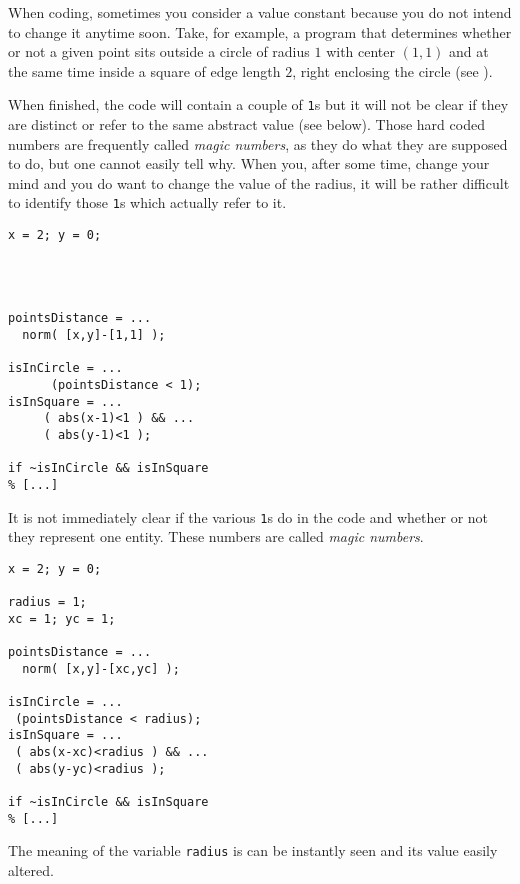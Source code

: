 When coding, sometimes you consider a value constant because you do not intend
to change it anytime soon. Take, for example, a program that determines
whether or not a given point sits outside a circle of radius $1$ with center
$(1,1)$ and at the same time inside a square of edge length $2$, right
enclosing the circle (see \cite{Hull:2006:CCM}).

When finished, the code will contain a couple of \lstinline!1!s but it will
not be clear if they are distinct or refer to the same abstract value (see
below).  Those hard coded numbers are frequently called \emph{magic numbers},
as they do what they are supposed to do, but one cannot easily tell why. When
you, after some time, change your mind and you do want to change the value of
the radius, it will be rather difficult to identify those \lstinline!1!s which
actually refer to it.


\hfill
\begin{minipage}[t]{.45\textwidth}\label{example:magic-numbers}
\begin{lstlisting}[framerule=2pt,rulecolor=\color{badred}]
x = 2; y = 0;




pointsDistance = ...
  norm( [x,y]-[1,1] );

isInCircle = ...
      (pointsDistance < 1);
isInSquare = ...
     ( abs(x-1)<1 ) && ...
     ( abs(y-1)<1 );

if ~isInCircle && isInSquare
% [...]
\end{lstlisting}
It is not immediately clear if the various \lstinline!1!s do in the code and
whether or not they represent one entity. These numbers are called \emph{magic
numbers}.
\end{minipage}
\hfill
\begin{minipage}[t]{.45\textwidth}
\begin{lstlisting}[framerule=2pt,rulecolor=\color{goodgreen}]
x = 2; y = 0;

radius = 1;
xc = 1; yc = 1;

pointsDistance = ...
  norm( [x,y]-[xc,yc] );

isInCircle = ...
 (pointsDistance < radius);
isInSquare = ...
 ( abs(x-xc)<radius ) && ...
 ( abs(y-yc)<radius );

if ~isInCircle && isInSquare
% [...]
\end{lstlisting}
The meaning of the variable \lstinline!radius! is can be instantly seen and its
value easily altered.
\end{minipage}
\hfill


